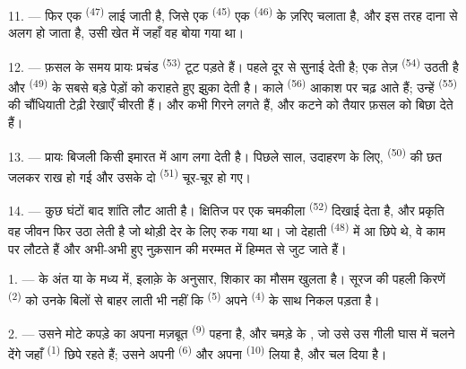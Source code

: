 11. --- फिर एक  \textsuperscript{(47)} लाई जाती है, जिसे एक
 \textsuperscript{(45)} एक  \textsuperscript{(46)}
के ज़रिए चलाता है, और इस तरह दाना  से अलग हो जाता है, उसी खेत में
जहाँ वह बोया गया था।

\VUsaut{5.0mm}
\VUsaut{3.4mm}

12. --- फ़सल के समय प्रायः प्रचंड  \textsuperscript{(53)} टूट पड़ते
हैं। पहले दूर से  सुनाई देती है; एक तेज़
 \textsuperscript{(54)} उठती है और 
\textsuperscript{(49)} के सबसे बड़े पेड़ों को कराहते हुए झुका देती है। काले
 \textsuperscript{(56)} आकाश पर चढ़ आते हैं; उन्हें
 \textsuperscript{(55)} की चौंधियाती टेढ़ी रेखाएँ चीरती हैं।
 और कभी  गिरने लगते हैं, और कटने को तैयार फ़सल को
बिछा देते हैं।

13. --- प्रायः बिजली किसी इमारत में आग लगा देती है। पिछले साल, उदाहरण के लिए,
 \textsuperscript{(50)} की छत जलकर राख हो गई और उसके दो
 \textsuperscript{(51)} चूर-चूर हो गए।

14. --- कुछ घंटों बाद शांति लौट आती है। क्षितिज पर एक चमकीला 
\textsuperscript{(52)} दिखाई देता है, और प्रकृति वह जीवन फिर उठा लेती है जो थोड़ी
देर के लिए रुक गया था। जो देहाती  \textsuperscript{(48)} में
आ छिपे थे, वे काम पर लौटते हैं और अभी-अभी हुए नुक़सान की मरम्मत में हिम्मत से
जुट जाते हैं।

\VUsaut{6.0mm}
\VUsaut{3.6mm}

\VUsaut{1.4mm}
\VUsaut{4.0mm}

1. ---  के अंत या  के मध्य में, इलाक़े के अनुसार,
शिकार का मौसम खुलता है। सूरज की पहली किरणें 
\textsuperscript{(2)} को उनके बिलों से बाहर लाती भी नहीं कि 
\textsuperscript{(5)} अपने  \textsuperscript{(4)} के साथ निकल
पड़ता है।

2. --- उसने मोटे कपड़े का अपना मज़बूत  \textsuperscript{(9)}
पहना है, और चमड़े के , जो उसे उस गीली घास में चलने देंगे जहाँ
 \textsuperscript{(1)} छिपे रहते हैं; उसने अपनी 
\textsuperscript{(6)} और अपना  \textsuperscript{(10)} लिया है,
और चल दिया है।

